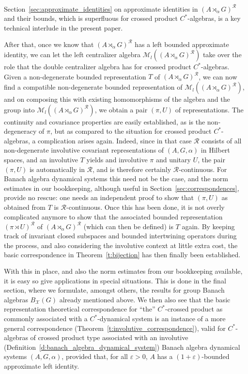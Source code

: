 \documentclass{amsart}
\theoremstyle{plain}
\theoremstyle{definition}
\numberwithin{equation}{section}
\begin{document}
Section~\ref{sec:approximate_identities} on approximate identities in ${(A {\rtimes}_\alpha G)^\mathcal{R}}$ and their bounds, which is superfluous for crossed product $C^*$-algebras, is a key technical interlude in the present paper. 

After that, once we know that ${(A {\rtimes}_\alpha G)^\mathcal{R}}$ has a left bounded approximate identity, we can let the left centralizer algebra $\mathcal M_l({(A {\rtimes}_\alpha G)^\mathcal{R}})$ take over the role that the double centralizer algebra has for crossed product $C^*$-algebras. Given a non-degenerate bounded representation $T$ of ${(A {\rtimes}_\alpha G)^\mathcal{R}}$, we can now find a compatible non-degenerate bounded representation of $\mathcal M_l({(A {\rtimes}_\alpha G)^\mathcal{R}})$, and on composing this with existing homomorphisms of the algebra and the group into $\mathcal M_l({(A {\rtimes}_\alpha G)^\mathcal{R}})$, we obtain a pair ${(\pi,U)}$ of representations. The continuity and covariance properties are easily established, as is the non-degeneracy of $\pi$, but as compared to the situation for crossed product $C^*$-algebras, a complication arises again. Indeed, since in that case ${\mathcal R}$ consists of all non-degenerate involutive covariant representations of ${(A,G,\alpha)}$ in Hilbert spaces, and an involutive $T$ yields and involutive $\pi$ and unitary $U$, the pair ${(\pi,U)}$ is automatically in ${\mathcal R}$, and is therefore certainly ${\mathcal R}$-continuous. For Banach algebra dynamical systems this need not be the case, and the norm estimates in our bookkeeping, although useful in Section~\ref{sec:correspondences}, provide no rescue: one needs an independent proof to show that ${(\pi,U)}$ as obtained from $T$ is ${\mathcal R}$-continuous. Once this has been done, it is not overly complicated anymore to show that the associated bounded representation ${(\pi \rtimes U)^\mathcal R}$ of ${(A {\rtimes}_\alpha G)^\mathcal{R}}$ (which can then be defined) is $T$ again. By keeping track of invariant closed subspaces and bounded intertwining operators during the process, and also considering the involutive context at little extra cost, the basic correspondence in Theorem~\ref{t:bijection} has then finally been established.

With this in place, and also the norm estimates from our bookkeeping available, it is easy so give applications in special situations. This is done in the final section, where we formulate, amongst others, the results for group Banach algebras $B_{\mathcal X}(G)$ already mentioned above. We then also see that the basic representation theoretical correspondence for ``the'' $C^*$-crossed product as commonly associated with a $C^*$-dynamical system is an instance of a more general correspondence (Theorem~\ref{t:involutive_correspondence}), valid for $C^*$-algebras of crossed product type associated with an involutive (Definition~\ref{d:banach_algebra_dynamical_system}) Banach algebra dynamical systems ${(A,G,\alpha)}$, provided that, for all ${\varepsilon}>0$, $A$ has a $(1+{\varepsilon})$-bounded approximate left identity.
\end{document}
